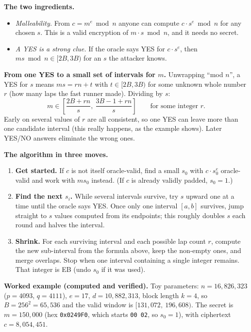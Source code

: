 \documentclass[11pt]{article}
\begin{document}
\textbf{The two ingredients.}
\begin{itemize}[nosep]
\item \emph{Malleability.} From $c=m^e\bmod n$ anyone can compute $c\cdot s^e\bmod n$ for any chosen $s$. This is a valid encryption of $m\cdot s \bmod n$, and it needs no secret.
\item \emph{A YES is a strong clue.} If the oracle says YES for $c\cdot s^e$, then $ms \bmod n\in[2B,3B)$ for an $s$ the attacker knows.
\end{itemize}

\textbf{From one YES to a small set of intervals for $m$.} Unwrapping ``mod $n$'', a YES for $s$ means $ms = rn + t$ with $t \in [2B,3B)$ for some unknown whole number $r$ (how many laps the fast runner made). Dividing by $s$:
\[
m\in\left[\frac{2B+rn}{s},\ \frac{3B-1+rn}{s}\right]\qquad\text{for some integer } r.
\]
Early on several values of $r$ are all consistent, so one YES can leave more than one candidate interval (this really happens, as the example shows). Later YES/NO answers eliminate the wrong ones.

\textbf{The algorithm in three moves.}
\begin{enumerate}[nosep]
\item \textbf{Get started.} If $c$ is not itself oracle-valid, find a small $s_0$ with $c\cdot s_0^e$ oracle-valid and work with $ms_0$ instead. (If $c$ is already validly padded, $s_0=1$.)
\item \textbf{Find the next $s_i$.} While several intervals survive, try $s$ upward one at a time until the oracle says YES. Once only one interval $[a,b]$ survives, jump straight to $s$ values computed from its endpoints; this roughly doubles $s$ each round and halves the interval.
\item \textbf{Shrink.} For each surviving interval and each possible lap count $r$, compute the new sub-interval from the formula above, keep the non-empty ones, and merge overlaps. Stop when one interval containing a single integer remains. That integer is EB (undo $s_0$ if it was used).
\end{enumerate}

\textbf{Worked example (computed and verified).} Toy parameters: $n=16{,}826{,}323$ ($p=4093$, $q=4111$), $e=17$, $d=10{,}882{,}313$, block length $k=4$, so $B=256^2=65{,}536$ and the valid window is $[131{,}072,\ 196{,}608)$. The secret is $m=150{,}000$ (hex \texttt{0x0249F0}, which starts \texttt{00 02}, so $s_0=1$), with ciphertext $c=8{,}054{,}451$.
\end{document}
